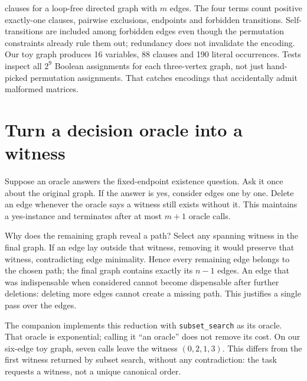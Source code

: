 clauses for a loop-free directed graph with \(m\) edges. The four terms
count positive exactly-one clauses, pairwise exclusions, endpoints and
forbidden transitions. Self-transitions are included among forbidden
edges even though the permutation constraints already rule them out;
redundancy does not invalidate the encoding. Our toy graph produces 16
variables, 88 clauses and 190 literal occurrences. Tests inspect all
\(2^9\) Boolean assignments for each three-vertex graph, not just
hand-picked permutation assignments. That catches encodings that
accidentally admit malformed matrices.

\section{Turn a decision oracle into a
witness}\label{turn-a-decision-oracle-into-a-witness}

Suppose an oracle answers the fixed-endpoint existence question. Ask it
once about the original graph. If the answer is yes, consider edges one
by one. Delete an edge whenever the oracle says a witness still exists
without it. This maintains a yes-instance and terminates after at most
\(m+1\) oracle calls.

Why does the remaining graph reveal a path? Select any spanning witness
in the final graph. If an edge lay outside that witness, removing it
would preserve that witness, contradicting edge minimality. Hence every
remaining edge belongs to the chosen path; the final graph contains
exactly its \(n-1\) edges. An edge that was indispensable when
considered cannot become dispensable after further deletions: deleting
more edges cannot create a missing path. This justifies a single pass
over the edges.

The companion implements this reduction with \texttt{subset\_search} as
its oracle. That oracle is exponential; calling it ``an oracle'' does
not remove its cost. On our six-edge toy graph, seven calls leave the
witness \((0,2,1,3)\). This differs from the first witness returned by
subset search, without any contradiction: the task requests a witness,
not a unique canonical order.


